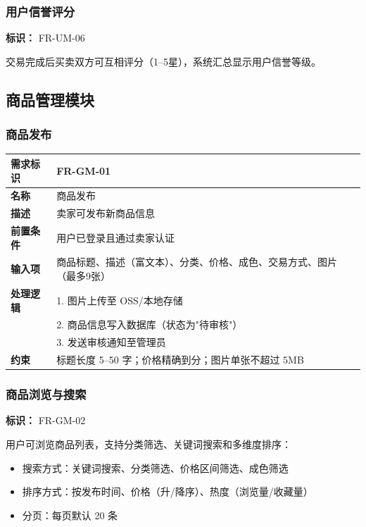\documentclass[12pt,a4paper,UTF8]{ctexart}
\begin{document}
\subsubsection{用户信誉评分}

\textbf{标识：} FR-UM-06

交易完成后买卖双方可互相评分（1--5星），系统汇总显示用户信誉等级。

\subsection{商品管理模块}

\subsubsection{商品发布}

\begin{longtable}{p{}|p{}}
    \toprule
    \textbf{需求标识} & FR-GM-01 \\
    \midrule
    \textbf{名称} & 商品发布 \\
    \midrule
    \textbf{描述} & 卖家可发布新商品信息 \\
    \midrule
    \textbf{前置条件} & 用户已登录且通过卖家认证 \\
    \midrule
    \textbf{输入项} & 商品标题、描述（富文本）、分类、价格、成色、交易方式、图片（最多9张） \\
    \midrule
    \textbf{处理逻辑} & 
    1. 图片上传至 OSS/本地存储 \\
    & 2. 商品信息写入数据库（状态为"待审核"） \\
    & 3. 发送审核通知至管理员 \\
    \midrule
    \textbf{约束} & 标题长度 5--50 字；价格精确到分；图片单张不超过 5MB \\
    \bottomrule
\end{longtable}

\subsubsection{商品浏览与搜索}

\textbf{标识：} FR-GM-02

用户可浏览商品列表，支持分类筛选、关键词搜索和多维度排序：
\begin{itemize}[itemsep=3pt]
    \item 搜索方式：关键词搜索、分类筛选、价格区间筛选、成色筛选
    \item 排序方式：按发布时间、价格（升/降序）、热度（浏览量/收藏量）
    \item 分页：每页默认 20 条
\end{itemize}
\end{document}
